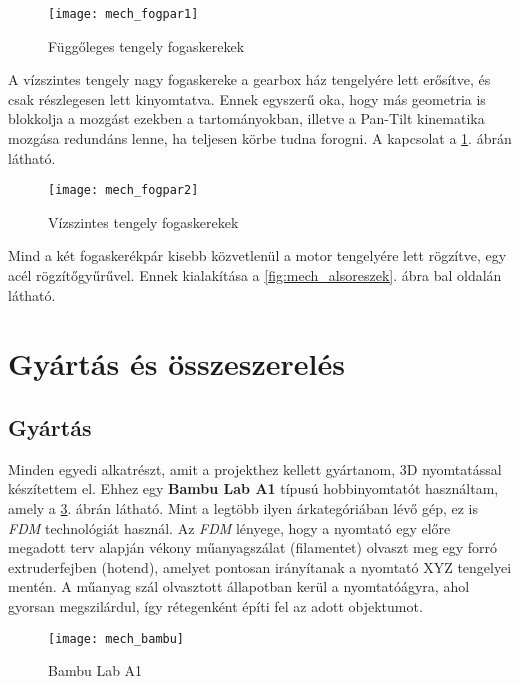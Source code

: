 \begin{figure}[h!]
	\centering
	\texttt{[image: mech\_fogpar1]}
	\caption{Függőleges tengely fogaskerekek}
	\label{fig:mech_fogpar1}
\end{figure}

A vízszintes tengely nagy fogaskereke a gearbox ház tengelyére lett erősítve, és csak részlegesen lett kinyomtatva. Ennek egyszerű oka, hogy más geometria is blokkolja a mozgást ezekben a tartományokban, illetve a Pan-Tilt kinematika mozgása redundáns lenne, ha teljesen körbe tudna forogni. A kapcsolat a \ref{fig:mech_fogpar1}. ábrán látható.

\begin{figure}[h!]
	\centering
	\texttt{[image: mech\_fogpar2]}
	\caption{Vízszintes tengely fogaskerekek}
	\label{fig:mech_fogpar2}
\end{figure}

Mind a két fogaskerékpár kisebb közvetlenül a motor tengelyére lett rögzítve, egy acél rögzítőgyűrűvel. Ennek kialakítása a \ref{fig:mech_alsoreszek}. ábra bal oldalán látható.

\pagebreak

\section{Gyártás és összeszerelés}
\subsection{Gyártás}



Minden egyedi alkatrészt, amit a projekthez kellett gyártanom, 3D nyomtatással készítettem el. Ehhez egy \textbf{Bambu Lab A1} \cite{bambu} típusú hobbinyomtatót használtam, amely a \ref{fig:mech_bambu}. ábrán látható. Mint a legtöbb ilyen árkategóriában lévő gép, ez is \textsl{FDM} technológiát használ. Az \textsl{FDM} lényege, hogy a nyomtató egy előre megadott terv alapján vékony műanyagszálat (filamentet) olvaszt meg egy forró extruderfejben (hotend), amelyet pontosan irányítanak a nyomtató XYZ tengelyei mentén. A műanyag szál olvasztott állapotban kerül a nyomtatóágyra, ahol gyorsan megszilárdul, így rétegenként építi fel az adott objektumot.\\

\begin{figure}[h!]
	\centering
	\texttt{[image: mech\_bambu]} 
	\caption{Bambu Lab A1 \cite{bambu}}
	\label{fig:mech_bambu}
\end{figure}
\pagebreak

